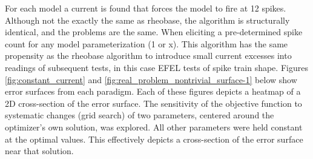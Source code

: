 For each model a current is found that forces the model to fire at 12 spikes. Although not the exactly the same as rheobase, the algorithm is structurally identical, and the problems are the same. When eliciting a pre-determined spike count for any model parameterization (1 or x). This algorithm has the same propensity as the rheobase algorithm to introduce small current excesses into readings of subsequent tests, in this case EFEL tests of spike train shape.
Figures \ref{fig:constant_current} and \ref{fig:real_problem_nontrivial_surface-1} below show error surfaces from each paradigm.
Each of these figures depicts a heatmap of a 2D cross-section of the error surface.
The sensitivity of the objective function to systematic changes (grid search) of two parameters, centered around the optimizer's own solution, was explored.
All other parameters were held constant at the optimal values.
This effectively depicts a cross-section of the error surface near that solution.



